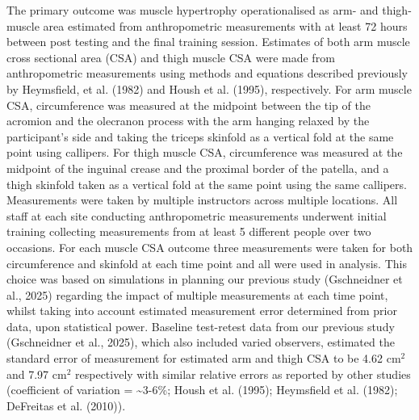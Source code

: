 \documentclass[
]{article}
\begin{document}
The primary outcome was muscle hypertrophy operationalised as arm- and
thigh- muscle area estimated from anthropometric measurements with at
least 72 hours between post testing and the final training session.
Estimates of both arm muscle cross sectional area (CSA) and thigh muscle
CSA were made from anthropometric measurements using methods and
equations described previously by Heymsfield, et al. (1982) and Housh et
al. (1995), respectively. For arm muscle CSA, circumference was measured
at the midpoint between the tip of the acromion and the olecranon
process with the arm hanging relaxed by the participant's side and
taking the triceps skinfold as a vertical fold at the same point using
callipers. For thigh muscle CSA, circumference was measured at the
midpoint of the inguinal crease and the proximal border of the patella,
and a thigh skinfold taken as a vertical fold at the same point using
the same callipers. Measurements were taken by multiple instructors
across multiple locations. All staff at each site conducting
anthropometric measurements underwent initial training collecting
measurements from at least 5 different people over two occasions. For
each muscle CSA outcome three measurements were taken for both
circumference and skinfold at each time point and all were used in
analysis. This choice was based on simulations in planning our previous
study (Gschneidner et al., 2025) regarding the impact of multiple
measurements at each time point, whilst taking into account estimated
measurement error determined from prior data, upon statistical power.
Baseline test-retest data from our previous study (Gschneidner et al.,
2025), which also included varied observers, estimated the standard
error of measurement for estimated arm and thigh CSA to be 4.62
\(\textrm{cm}^2\) and 7.97 \(\textrm{cm}^2\) respectively with similar
relative errors as reported by other studies (coefficient of variation =
\textasciitilde3-6\%; Housh et al. (1995); Heymsfield et al. (1982);
DeFreitas et al. (2010)).
\end{document}
